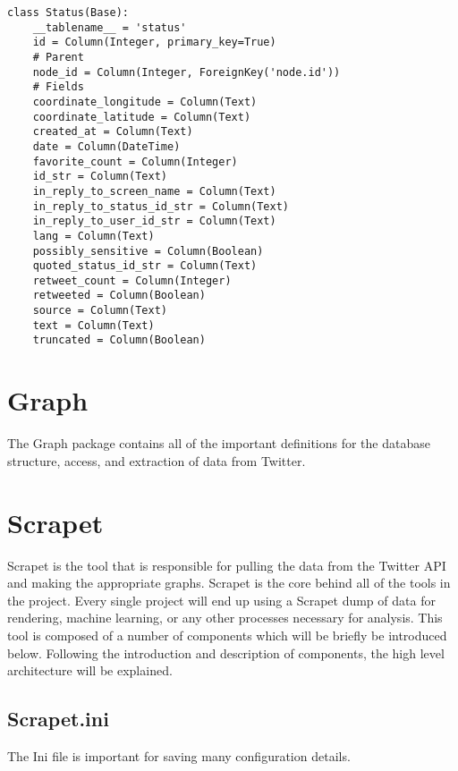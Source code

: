 \begin{lstlisting}
class Status(Base):
    __tablename__ = 'status'
    id = Column(Integer, primary_key=True)
    # Parent
    node_id = Column(Integer, ForeignKey('node.id'))
    # Fields
    coordinate_longitude = Column(Text)
    coordinate_latitude = Column(Text)
    created_at = Column(Text)
    date = Column(DateTime)
    favorite_count = Column(Integer)
    id_str = Column(Text)
    in_reply_to_screen_name = Column(Text)
    in_reply_to_status_id_str = Column(Text)
    in_reply_to_user_id_str = Column(Text)
    lang = Column(Text)
    possibly_sensitive = Column(Boolean)
    quoted_status_id_str = Column(Text)
    retweet_count = Column(Integer)
    retweeted = Column(Boolean)
    source = Column(Text)
    text = Column(Text)
    truncated = Column(Boolean)
\end{lstlisting}

\section{Graph}
The Graph package contains all of the important definitions for the database structure, access, and extraction of data from Twitter.

\section{Scrapet}
Scrapet is the tool that is responsible for pulling the data from the Twitter API and making the appropriate graphs. Scrapet is the core behind all of the tools in the project. Every single project will end up using a Scrapet dump of data for rendering, machine learning, or any other processes necessary for analysis. This tool is composed of a number of components which will be briefly be introduced below. Following the introduction and description of components, the high level architecture will be explained.

\subsection{Scrapet.ini}
The Ini file is important for saving many configuration details.

